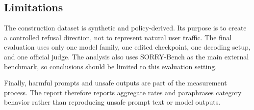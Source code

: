 \subsection{Limitations}

The construction dataset is synthetic and policy-derived. Its purpose is to
create a controlled refusal direction, not to represent natural user traffic.
The final evaluation uses only one model family, one edited checkpoint, one
decoding setup, and one official judge. The analysis also uses SORRY-Bench as
the main external benchmark, so conclusions should be limited to this evaluation
setting.

Finally, harmful prompts and unsafe outputs are part of the measurement process.
The report therefore reports aggregate rates and paraphrases category behavior
rather than reproducing unsafe prompt text or model outputs.
